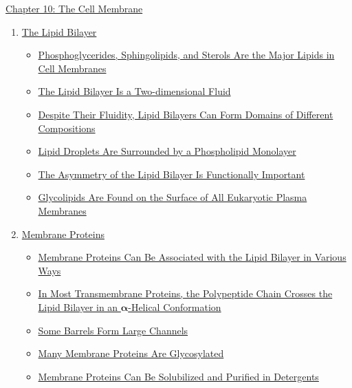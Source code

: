 \documentclass[12pt,letterpaper]{article}
\newcommand{\thetitle}{\hypertarget{home}{Cellular Biology}}
\begin{document}

\clearpage
\renewcommand{\thetitle}{\hypertarget{10}{The Genetic Code of Genes
and Genomes}}
\hypertarget{10}{} 


\begin{chapbox}{\hyperlink{home}{Chapter 10: The Cell Membrane}}
    \begin{enumerate}
        \item \hyperlink{10.1a}{The Lipid Bilayer}
        \begin{itemize}
            \item \hyperlink{10.1}{ Phosphoglycerides, Sphingolipids, and Sterols Are the Major Lipids in Cell Membranes}
            \item \hyperlink{10.2}{ The Lipid Bilayer Is a Two-dimensional Fluid}
            \item \hyperlink{10.3}{ Despite Their Fluidity, Lipid Bilayers Can Form Domains of Different Compositions}
            \item \hyperlink{10.4}{ Lipid Droplets Are Surrounded by a Phospholipid Monolayer}
            \item \hyperlink{10.5}{ The Asymmetry of the Lipid Bilayer Is Functionally Important}
            \item \hyperlink{10.6}{ Glycolipids Are Found on the Surface of All Eukaryotic Plasma Membranes}
        \end{itemize}
        \item \hyperlink{10.2a}{Membrane Proteins}
        \begin{itemize}
            \item \hyperlink{10.7}{ Membrane Proteins Can Be Associated with the Lipid Bilayer in Various Ways}
            \item \hyperlink{10.8}{ In Most Transmembrane Proteins, the Polypeptide Chain Crosses the Lipid Bilayer in an \(\bm{\alpha}\)-Helical Conformation}
            \item \hyperlink{10.9}{ Some \bfg{\beta} Barrels Form Large Channels}
            \item \hyperlink{10.10}{ Many Membrane Proteins Are Glycosylated}
            \item \hyperlink{10.11}{ Membrane Proteins Can Be Solubilized and Purified in Detergents}

\end{itemize}
\end{enumerate}
\end{chapbox}
\end{document}
